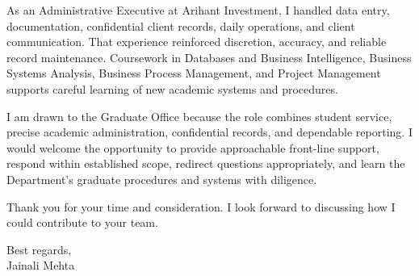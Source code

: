 \documentclass[letterpaper,10pt]{article}
\begin{document}
As an Administrative Executive at Arihant Investment, I handled data entry, documentation, confidential client records, daily operations, and client communication. That experience reinforced discretion, accuracy, and reliable record maintenance. Coursework in Databases and Business Intelligence, Business Systems Analysis, Business Process Management, and Project Management supports careful learning of new academic systems and procedures.

I am drawn to the Graduate Office because the role combines student service, precise academic administration, confidential records, and dependable reporting. I would welcome the opportunity to provide approachable front-line support, respond within established scope, redirect questions appropriately, and learn the Department's graduate procedures and systems with diligence.

Thank you for your time and consideration. I look forward to discussing how I could contribute to your team.

Best regards,\\[8pt]
Jainali Mehta
\end{document}
